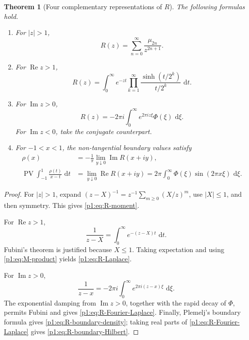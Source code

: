 \documentclass[11pt]{article}
\newtheorem{theorem}{Theorem}[section]
\theoremstyle{definition}
\theoremstyle{remark}
\newcommand{\dd}{\,\mathrm d}
\newcommand{\PV}{\operatorname{PV}}
\begin{document}
\begin{theorem}[Four complementary representations of \(R\)]\label{p1:thm:R-representations}
The following formulas hold.

\begin{enumerate}[label=(\roman*)]
\item For \(|z|>1\),
\begin{equation}
 R(z)=\sum_{n=0}^{\infty}\frac{\mu_{2n}}{z^{2n+1}}.          \label{p1:eq:R-moment}
\end{equation}
\item For \(\operatorname{Re}z>1\),
\begin{equation}
 R(z)=\int_0^{\infty}e^{-zt}
 \prod_{k=1}^{\infty}\frac{\sinh(t/2^k)}{t/2^k}\,\dd t.    \label{p1:eq:R-Laplace}
\end{equation}
\item For \(\operatorname{Im}z>0\),
\begin{equation}
 R(z)=-2\pi i\int_0^{\infty}e^{2\pi i z\xi}\Phi(\xi)\,\dd\xi. \label{p1:eq:R-Fourier-Laplace}
\end{equation}
For \(\operatorname{Im}z<0\), take the conjugate counterpart.
\item For \(-1<x<1\), the non-tangential boundary values satisfy
\begin{align}
 \rho(x)&=-\frac1\pi\lim_{y\downarrow0}\operatorname{Im}R(x+iy),
                                                               \label{p1:eq:R-boundary-density}\\
 \PV\int_{-1}^{1}\frac{\rho(t)}{x-t}\,\dd t
 &=\lim_{y\downarrow0}\operatorname{Re}R(x+iy)
 =2\pi\int_0^{\infty}\Phi(\xi)\sin(2\pi x\xi)\,\dd\xi.     \label{p1:eq:R-boundary-Hilbert}
\end{align}
\end{enumerate}
\end{theorem}

\begin{proof}
For \(|z|>1\), expand \((z-X)^{-1}=z^{-1}\sum_{m\ge0}(X/z)^m\), use
\(|X|\le1\), and then symmetry.  This gives \eqref{p1:eq:R-moment}.

For \(\operatorname{Re}z>1\),
\[
 \frac1{z-X}=\int_0^{\infty}e^{-(z-X)t}\,\dd t.
\]
Fubini's theorem is justified because \(X\le1\).  Taking expectation and using
\eqref{p1:eq:M-product} yields \eqref{p1:eq:R-Laplace}.

For \(\operatorname{Im}z>0\),
\[
 \frac1{z-x}=-2\pi i\int_0^{\infty}e^{2\pi i(z-x)\xi}\,\dd\xi.
\]
The exponential damping from \(\operatorname{Im}z>0\), together with the rapid decay of
\(\Phi\), permits Fubini and gives \eqref{p1:eq:R-Fourier-Laplace}.  Finally,
Plemelj's boundary formula gives \eqref{p1:eq:R-boundary-density}; taking real parts of
\eqref{p1:eq:R-Fourier-Laplace} gives \eqref{p1:eq:R-boundary-Hilbert}.
\end{proof}
\end{document}
